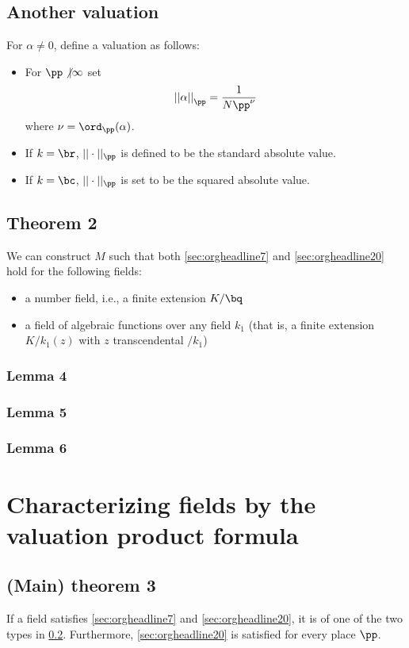 \subsection{Another valuation}
\label{sec:orgheadline21}
For \(\alpha\neq 0\), define a valuation as follows:
\begin{itemize}
\item For \(\pp \not | \infty\) set
\[ { ||\alpha|| }_\pp = \frac1{ N\pp^\nu } \]
where \(\nu = \ord_\pp(\alpha)\).
\item If \(k=\br\), \(||\cdot||_\pp\) is defined to be the standard absolute value.
\item If \(k=\bc\), \(||\cdot||_\pp\) is set to be the squared absolute value.
\end{itemize}
\subsection{Theorem 2}
\label{sec:orgheadline25}
We can construct \(M\) such that both \ref{sec:orgheadline7} and \ref{sec:orgheadline20} hold for the following fields:
\begin{itemize}
\item a number field, i.e., a finite extension \(K/\bq\)
\item a field of algebraic functions over any field \(k_1\) (that is, a finite extension \(K/k_1(z)\) with \(z\) transcendental \(/k_1\))
\end{itemize}
\subsubsection{Lemma 4}
\label{sec:orgheadline22}
\subsubsection{Lemma 5}
\label{sec:orgheadline23}
\subsubsection{Lemma 6}
\label{sec:orgheadline24}

\section{Characterizing fields by the valuation product formula}
\label{sec:orgheadline28}
\subsection{(Main) theorem 3}
\label{sec:orgheadline27}
If a field satisfies \ref{sec:orgheadline7} and \ref{sec:orgheadline20}, it is of one of the two types in \ref{sec:orgheadline25}. Furthermore, \ref{sec:orgheadline20} is satisfied for every place \(\pp\).

